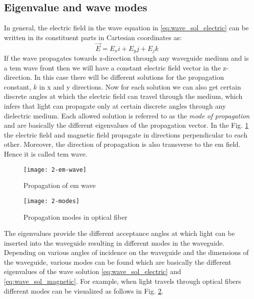 \documentclass[../report.tex]{subfiles}
\begin{document}
		\subsection{Eigenvalue and wave modes}
In general, the electric field in the wave equation in \ref{eq:wave_sol_electric} can be written in its constituent parts in Cartesian coordinates as:
\begin{equation}\label{eq:e_field_cart_cord}
\overrightarrow{E}=E_{x}i+E_{y}j+E_{j}k
\end{equation}
If the wave propagates towards z-direction through any waveguide medium and is a \gls{tem} wave front then we will have a constant electric field vector in the z-direction. In this case there will be different solutions for the propagation constant, $k$ in x and y directions. Now for each solution we can also get certain discrete angles at which the electric field can travel through the medium, which infers that light can propagate only at certain discrete angles through any dielectric medium. Each allowed solution is referred to as the \textit{mode of propagation} and are basically the different eigenvalues of the propagation vector. In the Fig. \ref{fig:2_em_wave} the electric field and magnetic field propagate in directions perpendicular to each other. Moreover, the direction of propagation is also transverse to the \gls{em} field. Hence it is called \gls{tem} wave.
\begin{figure}[H]
	\centering
	\texttt{[image: 2-em-wave]}
	\caption{Propagation of \gls{em} wave}
	\label{fig:2_em_wave}
\end{figure}
\begin{figure}[H]
	\centering
	\texttt{[image: 2-modes]}
	\caption{Propagation modes in optical fiber}
	\label{fig:2_modes}
\end{figure}
The eigenvalues provide the different acceptance angles at which light can be inserted into the waveguide resulting in different modes in the waveguide. Depending on various angles of incidence on the waveguide and the dimensions of the waveguide, various modes can be found which are basically the different eigenvalues of the wave solution \ref{eq:wave_sol_electric} and \ref{eq:wave_sol_magnetic}. For example, when light travels through optical fibers different modes can be visualized as follows in Fig. \ref{fig:2_modes}.
\end{document}
